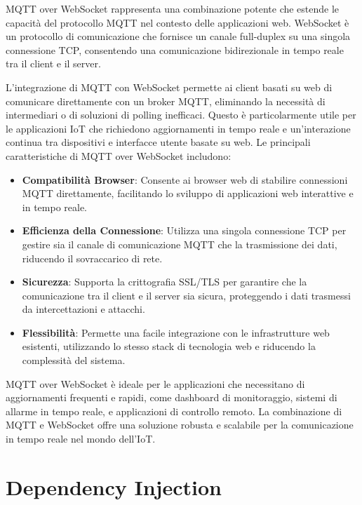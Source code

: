 \documentclass[12pt,a4paper,openright,twoside]{book}
\begin{document}
MQTT over WebSocket rappresenta una combinazione potente che estende le capacità del protocollo \ac{MQTT} nel contesto delle applicazioni web. WebSocket è un protocollo 
di comunicazione che fornisce un canale full-duplex su una singola connessione \ac{TCP}, consentendo una comunicazione bidirezionale in tempo reale tra il client e il server.

L'integrazione di \ac{MQTT} con WebSocket permette ai client basati su web di comunicare direttamente con un broker \ac{MQTT}, eliminando la necessità di intermediari o di 
soluzioni di polling inefficaci. Questo è particolarmente utile per le applicazioni \ac{IoT} che richiedono aggiornamenti in tempo reale e un'interazione continua tra 
dispositivi e interfacce utente basate su web. Le principali caratteristiche di MQTT over WebSocket includono:

\begin{itemize}
    \item \textbf{Compatibilità Browser}: 
    Consente ai browser web di stabilire connessioni \ac{MQTT} direttamente, facilitando lo sviluppo di applicazioni web interattive e in tempo reale.
    \item \textbf{Efficienza della Connessione}: 
    Utilizza una singola connessione \ac{TCP} per gestire sia il canale di comunicazione \ac{MQTT} che la trasmissione dei dati, riducendo il sovraccarico di rete.
    \item \textbf{Sicurezza}: 
    Supporta la crittografia SSL/TLS per garantire che la comunicazione tra il client e il server sia sicura, proteggendo i dati trasmessi da intercettazioni e attacchi.
    \item \textbf{Flessibilità}: 
    Permette una facile integrazione con le infrastrutture web esistenti, utilizzando lo stesso stack di tecnologia web e riducendo la complessità del sistema.
\end{itemize}

MQTT over WebSocket è ideale per le applicazioni che necessitano di aggiornamenti frequenti e rapidi, come dashboard di monitoraggio, sistemi di allarme in tempo reale, 
e applicazioni di controllo remoto. La combinazione di \ac{MQTT} e WebSocket offre una soluzione robusta e scalabile per la comunicazione in tempo reale nel mondo dell'\ac{IoT}.

\section{Dependency Injection}
\end{document}
